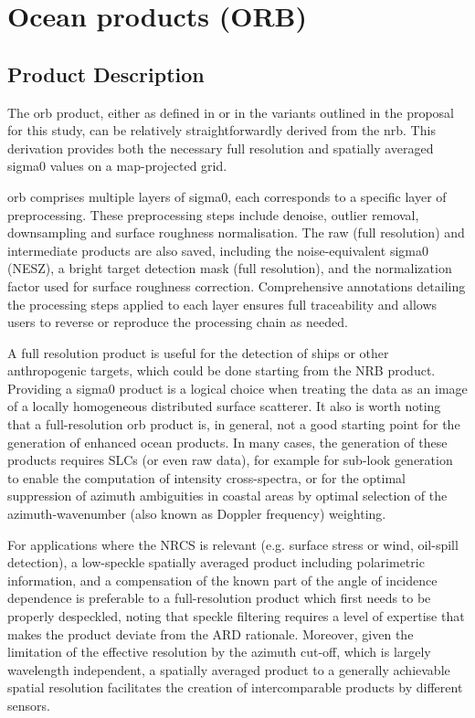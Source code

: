 
\section{Ocean products (ORB)}
\label{sec:orb_product}

\subsection{Product Description}
\label{sec:orb_prod_description}
The \acs{orb} product, either as defined in \cite{CEOS-ARD_PFS_ORB} or in the variants outlined in the proposal for this study, can be relatively straightforwardly derived from the \acs{nrb}. This derivation provides both the necessary full resolution and spatially averaged \gls{sigma0} values on a map-projected grid. 

\acs{orb} comprises multiple layers of \gls{sigma0}, each corresponds to a specific layer of preprocessing. These preprocessing steps include denoise, outlier removal, downsampling and surface roughness normalisation. The raw (full resolution) and intermediate products are also saved, including the noise-equivalent \gls{sigma0} (NESZ), a bright target detection mask (full resolution), and the normalization factor used for surface roughness correction. Comprehensive annotations detailing the processing steps applied to each layer ensures full traceability and allows users to reverse or reproduce the processing chain as needed.

A full resolution product is useful for the detection of ships or other anthropogenic targets, which could be done starting from the NRB product. Providing a \gls{sigma0} product is a logical choice when treating the data as an image of a locally homogeneous distributed surface scatterer. It also is worth noting that a full-resolution \acs{orb} product is, in general, not a good starting point for the generation of enhanced ocean products. In many cases, the generation of these products requires SLCs (or even raw data), for example for sub-look generation to enable the computation of intensity cross-spectra, or for the optimal suppression of azimuth ambiguities in coastal areas by optimal selection of the azimuth-wavenumber (also known as Doppler frequency) weighting. 

For applications where the NRCS is relevant (e.g. surface stress or wind, oil-spill detection), a low-speckle spatially averaged product including polarimetric information, and a compensation of the known part of the angle of incidence dependence is preferable to a full-resolution product which first needs to be properly despeckled, noting that speckle filtering requires a level of expertise that makes the product deviate from the ARD rationale. Moreover, given the limitation of the effective resolution by the azimuth cut-off, which is largely wavelength independent, a spatially averaged product to a generally achievable spatial resolution facilitates the creation of intercomparable products by different sensors.

